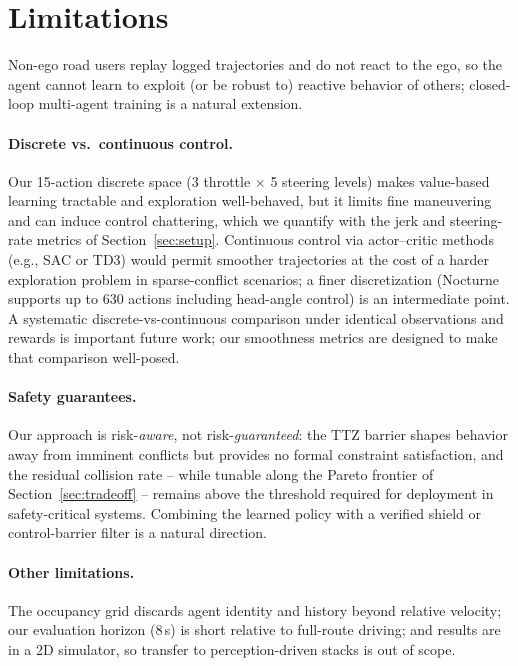 \documentclass{article}
\begin{document}
\section{Limitations}
\label{sec:limitations}

Non-ego road users replay logged trajectories and do not react to the ego,
so the agent cannot learn to exploit (or be robust to) reactive behavior of
others; closed-loop multi-agent training is a natural extension.

\paragraph{Discrete vs.\ continuous control.}
Our 15-action discrete space (3 throttle $\times$ 5 steering levels) makes
value-based learning tractable and exploration well-behaved, but it limits
fine maneuvering and can induce control chattering, which we quantify with
the jerk and steering-rate metrics of Section~\ref{sec:setup}. Continuous
control via actor--critic methods (e.g., SAC or TD3) would permit smoother
trajectories at the cost of a harder exploration problem in
sparse-conflict scenarios; a finer discretization (Nocturne supports up to
630 actions including head-angle control) is an intermediate point. A
systematic discrete-vs-continuous comparison under identical observations
and rewards is important future work; our smoothness metrics are designed
to make that comparison well-posed.

\paragraph{Safety guarantees.}
Our approach is risk-\emph{aware}, not risk-\emph{guaranteed}: the TTZ
barrier shapes behavior away from imminent conflicts but provides no formal
constraint satisfaction, and the residual collision rate -- while
tunable along the Pareto frontier of Section~\ref{sec:tradeoff} -- remains
above the threshold required for deployment in safety-critical systems.
Combining the learned policy with a verified shield or control-barrier
filter is a natural direction.

\paragraph{Other limitations.}
The occupancy grid discards agent identity and history beyond relative
velocity; our evaluation horizon (8\,s) is short relative to full-route
driving; and results are in a 2D simulator, so transfer to
perception-driven stacks is out of scope.
\end{document}
